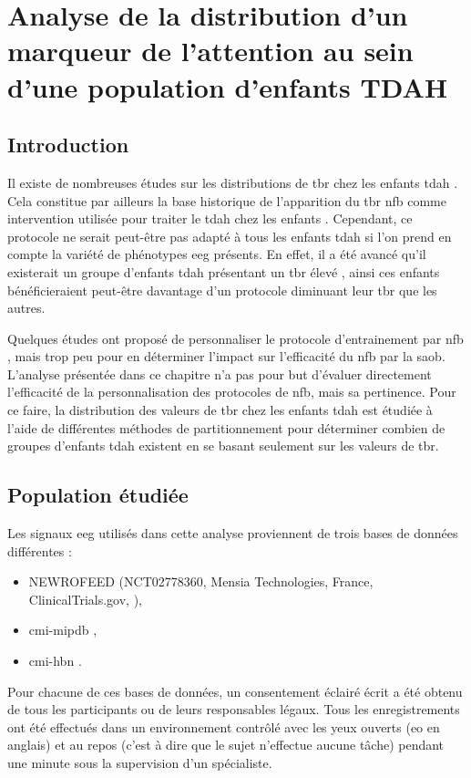 \chapter{Analyse de la distribution d'un marqueur de l'attention au sein d'une population d'enfants TDAH} \label{chapitre-4}

\section*{Introduction}
Il existe de nombreuses études sur les distributions de \gls{tbr} chez les enfants \gls{tdah}
\citep{Arns2013, Clarke2001, Zhang2017}. Cela constitue par ailleurs la base historique de l'apparition du \gls{tbr} \gls{nfb} comme intervention utilisée
pour traiter le \gls{tdah} chez les enfants \citep{Arnold2014, Deilami2016, Gevensleben2009, VanDongen2013}. Cependant, ce protocole ne serait 
peut-être pas adapté à tous les enfants \gls{tdah} si 
l'on prend en compte la variété de phénotypes \gls{eeg} présents. En effet, il a été avancé qu'il existerait un groupe d'enfants \gls{tdah} présentant un \gls{tbr} élevé 
\citep{Zhang2017, Clarke2011}, ainsi ces enfants bénéficieraient peut-être davantage d'un protocole diminuant leur \gls{tbr} que les autres. 

Quelques études ont proposé de personnaliser le protocole d'entrainement par \gls{nfb} \citep{Bazanova2018, Escolano2014}, mais trop peu pour en déterminer
l'impact sur l'efficacité du \gls{nfb} par la \gls{saob}. L'analyse présentée dans ce chapitre n'a pas pour but d'évaluer directement l'efficacité de la 
personnalisation des protocoles de \gls{nfb}, mais sa pertinence. Pour ce faire, la distribution des valeurs de \gls{tbr} chez les enfants \gls{tdah} est 
étudiée à l'aide de différentes méthodes de partitionnement pour déterminer combien de groupes d'enfants \gls{tdah} existent en se basant seulement sur les 
valeurs de \gls{tbr}. 
\clearpage

\section{Population étudiée}

Les signaux \gls{eeg} utilisés dans cette analyse proviennent de trois bases de données différentes :
\begin{itemize}
\item NEWROFEED (NCT02778360, Mensia Technologies, France, ClinicalTrials.gov, \citet{Bioulac2019}),
\item \gls{cmi-mipdb} \citep{Langer2017, Langer2017b},
\item \gls{cmi-hbn} \citep{Alexander2017, Alexander2017b}.
\end{itemize}
Pour chacune de ces bases de données, un consentement éclairé écrit a été obtenu de tous les participants ou de leurs responsables légaux. Tous les enregistrements
ont été effectués dans un environnement contrôlé avec les yeux ouverts (\gls{eo} en anglais) et au repos (c'est à dire que le sujet n'effectue aucune tâche) 
pendant une minute sous la supervision d'un spécialiste. 

